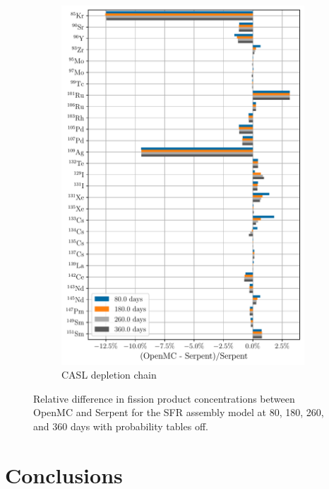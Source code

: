 \documentclass[3p,authoryear]{elsarticle}
\begin{document}
\begin{figure}[H]
  \hspace{0.05\textwidth}
  \begin{subfigure}[t]{0.45\textwidth}
    \includegraphics[width=\textwidth]{figures/sfr_fp_casl_average_nop.pdf}
    \caption{CASL depletion chain}
  \end{subfigure}
  \caption{Relative difference in fission product concentrations between OpenMC
  and Serpent for the SFR assembly model at 80, 180, 260, and 360 days with
  probability tables off.}
  \label{fig:sfr-fp-nop}
\end{figure}

\section{Conclusions}
\label{sec:conclusions}
\end{document}
